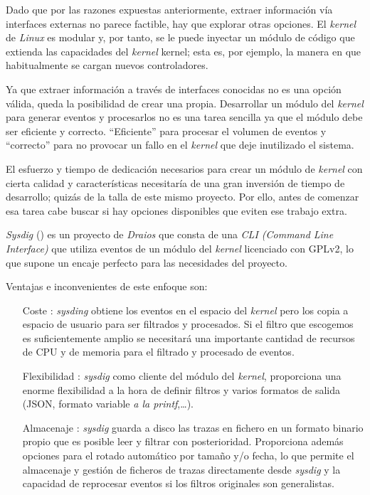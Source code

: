 Dado que por las razones expuestas anteriormente, extraer información vía interfaces externas no parece factible, hay que explorar otras opciones.
El \emph{kernel} de \emph{Linux} es modular y, por tanto, se le puede inyectar un módulo de código que extienda las capacidades del \emph{kernel} kernel; esta es, por ejemplo, la manera
en que habitualmente se cargan nuevos controladores.

Ya que extraer información a través de interfaces conocidas no es una opción válida, queda la posibilidad de crear una propia. 
Desarrollar un módulo del \emph{kernel} para generar eventos y procesarlos no es una tarea sencilla ya que el módulo debe ser eficiente y correcto. ``Eficiente'' para procesar el volumen
de eventos y ``correcto'' para no provocar un fallo en el \emph{kernel} que deje inutilizado el sistema.

El esfuerzo y tiempo de dedicación necesarios para crear un módulo de \emph{kernel} con cierta calidad y características necesitaría de una gran inversión de tiempo de desarrollo; quizás de la talla
de este mismo proyecto. Por ello, antes de comenzar esa tarea cabe buscar si hay opciones disponibles que eviten ese trabajo extra.

\emph{Sysdig} (\cite{sysdig-project}) es un proyecto de \emph{Draios} que consta de una \emph{CLI (Command Line Interface)} que utiliza eventos de un módulo del \emph{kernel}
licenciado con GPLv2, lo que supone un encaje perfecto para las necesidades del proyecto.

Ventajas e inconvenientes de este enfoque son:

\begin{enumerate}
    \item[Coste]: \emph{sysding} obtiene los eventos en el espacio del \emph{kernel} pero los copia a espacio de usuario para ser
    filtrados y procesados. Si el filtro que escogemos es suficientemente amplio se necesitará una importante cantidad de recursos de CPU y de memoria para el filtrado y procesado de eventos.
    \item[Flexibilidad]: \emph{sysdig} como cliente del módulo del \emph{kernel}, proporciona una enorme flexibilidad a la hora de definir filtros y varios formatos de salida (JSON, formato variable \emph{a la printf},\ldots).
    \item[Almacenaje]: \emph{sysdig} guarda a disco las trazas en fichero en un formato binario propio que es posible leer y filtrar con posterioridad. Proporciona además opciones para el rotado automático por tamaño y/o fecha,
    lo que permite el almacenaje y gestión de ficheros de trazas directamente desde \emph{sysdig} y la capacidad de reprocesar eventos si los filtros originales son generalistas. 
\end{enumerate}

